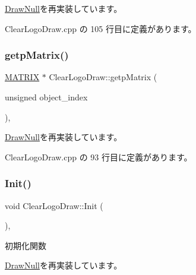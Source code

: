 \mbox{\hyperlink{class_draw_null_aa07d7e89e723b68ec257da0f63d43f70}{Draw\+Null}}を再実装しています。



 Clear\+Logo\+Draw.\+cpp の 105 行目に定義があります。

\mbox{\label{class_clear_logo_draw_abcbd0cd8663e0262bcdd83356516082b}} 
\subsubsection{\texorpdfstring{getp\+Matrix()}{getpMatrix()}}
{\footnotesize\ttfamily \mbox{\hyperlink{_vector3_d_8h_a032295cd9fb1b711757c90667278e744}{M\+A\+T\+R\+IX}} $\ast$ Clear\+Logo\+Draw\+::getp\+Matrix (\begin{DoxyParamCaption}\item[{unsigned}]{object\+\_\+index }\end{DoxyParamCaption})\hspace{0.3cm}{\ttfamily [override]}, {\ttfamily [virtual]}}



\mbox{\hyperlink{class_draw_null_a001901c340671106a33d44b9d4aef4c4}{Draw\+Null}}を再実装しています。



 Clear\+Logo\+Draw.\+cpp の 93 行目に定義があります。

\mbox{\label{class_clear_logo_draw_a9af656c0a8ebfb5fa133a0983add6ffd}} 
\subsubsection{\texorpdfstring{Init()}{Init()}}
{\footnotesize\ttfamily void Clear\+Logo\+Draw\+::\+Init (\begin{DoxyParamCaption}{ }\end{DoxyParamCaption})\hspace{0.3cm}{\ttfamily [override]}, {\ttfamily [virtual]}}



初期化関数 



\mbox{\hyperlink{class_draw_null_acd7fef3ccea1da537ac9507ffbb6dd2e}{Draw\+Null}}を再実装しています。




